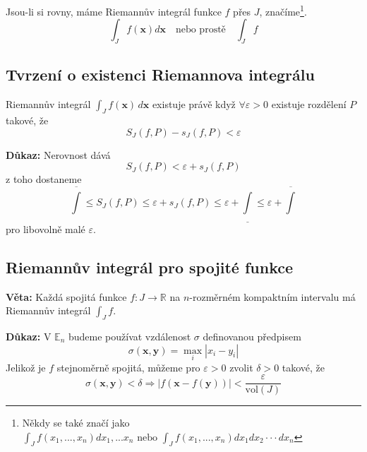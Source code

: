 \documentclass[../main.tex]{subfiles}
\begin{document}
\noindent
Jsou-li si rovny, máme Riemannův integrál funkce $f$ přes $J$, značíme\footnote{Někdy se také značí jako \(\int_J f(x_1,...,x_n)dx_1,...x_n \text{ nebo } \int_J f(x_1,...,x_n)dx_1 dx_2\cdot \cdot \cdot dx_n\)}.
$$\int_J f(\textbf{x})d\textbf{x} \quad \text{nebo prostě} \quad \int_J f $$



\subsection{Tvrzení o existenci Riemannova integrálu}
\hspace{1.2mm}
Riemannův integrál $\int_{J} f(\mathbf{x}) \,d\mathbf{x}$ existuje právě když
$\forall \varepsilon > 0$ existuje rozdělení $P$ takové, že
\[ S_J(f,P) - s_J(f,P) < \varepsilon \]

\noindent
\textbf{Důkaz:}
Nerovnost dává \[ S_J(f,P) < \varepsilon + s_J(f,P) \]
z toho dostaneme
\[ \overline{\int} \leq S_J(f,P) \leq \varepsilon + s_J(f,P) \leq \varepsilon + \underline{\int} \leq
\varepsilon + \overline{\int}\]
pro libovolně malé $\varepsilon$.

\subsection{Riemannův integrál pro spojité funkce}
\hspace{1.2mm}
\textbf{Věta:}
Každá spojitá funkce $f: J \to \mathbb{R}$ na $n$-rozměrném kompaktním intervalu má Riemannův integrál
$\int_{J}f$.

\vspace{5mm}
\noindent
\hspace{1.2mm}
\textbf{Důkaz:}
V $\mathbb{E}_n$ budeme používat vzdálenost $\sigma$ definovanou předpisem
\[ \sigma (\mathbf{x}, \mathbf{y}) = \max_{i} |x_i - y_i| \]
Jelikož je $f$ stejnoměrně spojitá, můžeme pro $\varepsilon > 0$ zvolit $\delta > 0$ takové, že
\[ \sigma (\mathbf{x}, \mathbf{y}) < \delta \Rightarrow
|f(\mathbf{x} - f(\mathbf{y}))| < \frac{\varepsilon}{\textrm{vol}(J)} \]
\end{document}
